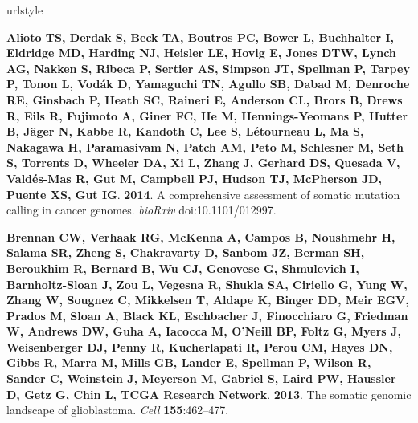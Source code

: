 \documentclass[11 pt]{article} %
\begin{document}
\begin{thebibliography}{31}
\providecommand{\natexlab}[1]{#1}
\providecommand{\url}[1]{\texttt{#1}}
\providecommand{\urlprefix}{URL }
\expandafter\ifx\csname urlstyle\endcsname\relax
  \providecommand{\doi}[1]{doi:\discretionary{}{}{}#1}\else
  \providecommand{\doi}{doi:\discretionary{}{}{}\begingroup
  \urlstyle{rm}\Url}\fi

\textbf{Alioto TS, Derdak S, Beck TA, Boutros PC, Bower L, Buchhalter I,
  Eldridge MD, Harding NJ, Heisler LE, Hovig E, Jones DTW, Lynch AG, Nakken S,
  Ribeca P, Sertier AS, Simpson JT, Spellman P, Tarpey P, Tonon L, Vodák D,
  Yamaguchi TN, Agullo SB, Dabad M, Denroche RE, Ginsbach P, Heath SC, Raineri
  E, Anderson CL, Brors B, Drews R, Eils R, Fujimoto A, Giner FC, He M,
  Hennings-Yeomans P, Hutter B, Jäger N, Kabbe R, Kandoth C, Lee S,
  Létourneau L, Ma S, Nakagawa H, Paramasivam N, Patch AM, Peto M, Schlesner
  M, Seth S, Torrents D, Wheeler DA, Xi L, Zhang J, Gerhard DS, Quesada V,
  Valdés-Mas R, Gut M, Campbell PJ, Hudson TJ, McPherson JD, Puente XS, Gut
  IG}. \textbf{2014}.
\newblock A comprehensive assessment of somatic mutation calling in cancer
  genomes.
\newblock \emph{bioRxiv} \doi{10.1101/012997}.

\textbf{Brennan CW, Verhaak RG, McKenna A, Campos B, Noushmehr H, Salama SR,
  Zheng S, Chakravarty D, Sanbom JZ, Berman SH, Beroukhim R, Bernard B, Wu CJ,
  Genovese G, Shmulevich I, Barnholtz-Sloan J, Zou L, Vegesna R, Shukla SA,
  Ciriello G, Yung W, Zhang W, Sougnez C, Mikkelsen T, Aldape K, Binger DD,
  Meir EGV, Prados M, Sloan A, Black KL, Eschbacher J, Finocchiaro G, Friedman
  W, Andrews DW, Guha A, Iacocca M, O'Neill BP, Foltz G, Myers J, Weisenberger
  DJ, Penny R, Kucherlapati R, Perou CM, Hayes DN, Gibbs R, Marra M, Mills GB,
  Lander E, Spellman P, Wilson R, Sander C, Weinstein J, Meyerson M, Gabriel S,
  Laird PW, Haussler D, Getz G, Chin L, {TCGA Research Network}}.
  \textbf{2013}.
\newblock The somatic genomic landscape of glioblastoma.
\newblock \emph{Cell} \textbf{155}:462--477.


\end{thebibliography}
\end{document}
